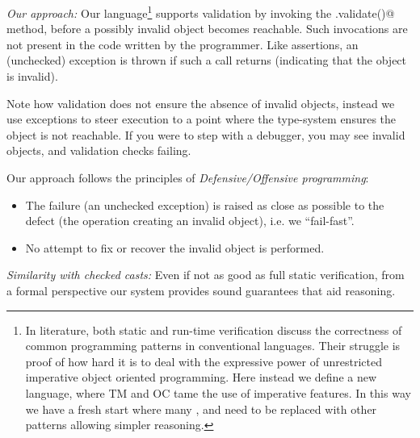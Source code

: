\loseSpace
\noindent\textit{Our approach:}
Our language\footnote{
In literature, both static and run-time verification discuss
the correctness of common programming patterns in conventional languages.
Their struggle is proof of how hard it is to deal with the expressive power of unrestricted imperative object oriented programming.
 Here instead we define a new language, where TM and OC tame the use of imperative features. In this way
we have a fresh start where
many ,
and need to be replaced with other patterns allowing simpler reasoning.
} supports validation by invoking the \Q@.validate()@ method, before a possibly invalid object becomes reachable. Such invocations are not present in the code written by the programmer. 
Like assertions, an (unchecked) exception is thrown if such a call returns \Q@false@ (indicating that the object is invalid).

Note how validation does not ensure the absence of invalid objects, instead we use exceptions to steer execution to a point where the type-system ensures the object is not reachable.
If you were to step with a debugger, you may see invalid objects, and validation checks failing.

\noindent Our approach follows the principles of \emph{Defensive/Offensive programming}:
\begin{itemize}
\item The failure (an unchecked exception)
is raised as close as possible to the defect (the operation creating an invalid object), i.e. we ``fail-fast''.
\item No attempt to fix or recover the invalid object is performed.
\end{itemize}


%
\noindent\textit{Similarity with checked casts:}
Even if not as good as full static verification, from a formal perspective
our system provides sound guarantees that aid reasoning.


